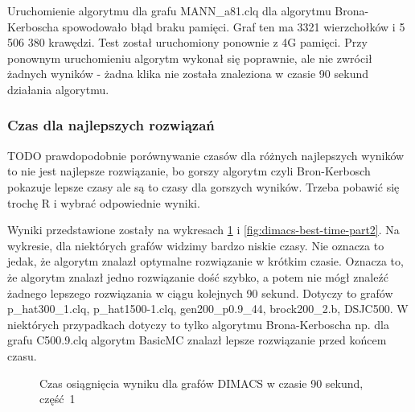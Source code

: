 \documentclass[12pt, a4paper]{article}
\begin{document}
Uruchomienie algorytmu dla grafu MANN\_a81.clq dla algorytmu Brona-Kerboscha spowodowało błąd braku pamięci. Graf ten ma 3321 wierzchołków i 5 506 380 krawędzi. Test został uruchomiony ponownie z 4G pamięci. Przy ponownym uruchomieniu algorytm wykonał się poprawnie, ale nie zwrócił żadnych wyników - żadna klika nie została znaleziona w czasie 90 sekund działania algorytmu.

\subsubsection{Czas dla najlepszych rozwiązań}
TODO prawdopodobnie porównywanie czasów dla różnych najlepszych wyników to nie jest najlepsze rozwiązanie, bo gorszy algorytm czyli Bron-Kerbosch pokazuje lepsze czasy ale są to czasy dla gorszych wyników. Trzeba pobawić się trochę R i wybrać odpowiednie wyniki.

Wyniki przedstawione zostały na wykresach \ref{fig:dimacs-best-time-part1} i \ref{fig:dimacs-best-time-part2}. Na wykresie, dla niektórych grafów widzimy bardzo niskie czasy. Nie oznacza to jedak, że algorytm znalazł optymalne rozwiązanie w krótkim czasie. Oznacza to, że algorytm znalazł jedno rozwiązanie dość szybko, a potem nie mógł znaleźć żadnego lepszego rozwiązania w ciągu kolejnych 90 sekund. Dotyczy to grafów 
p\_hat300\_1.clq, p\_hat1500-1.clq, gen200\_p0.9\_44, brock200\_2.b, DSJC500. W niektórych przypadkach dotyczy to tylko algorytmu Brona-Kerboscha np. dla grafu C500.9.clq algorytm BasicMC znalazł lepsze rozwiązanie przed końcem czasu.



\begin{figure}[H]
  \begin{center}
  \end{center}
  \caption{Czas osiągnięcia wyniku dla grafów DIMACS w czasie 90 sekund, część 1}
  \label{fig:dimacs-best-time-part1}
\end{figure}
\end{document}
